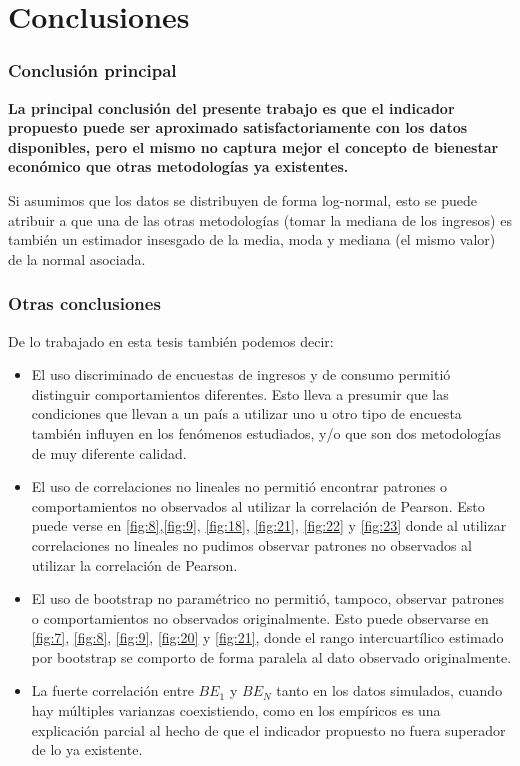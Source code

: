 \chapter{Conclusiones} \label{chapter:conclusiones}

\subsection{Conclusión principal}

\textbf{La principal conclusión del presente trabajo es que el indicador propuesto puede ser aproximado satisfactoriamente con los datos disponibles, pero el mismo no captura mejor el concepto de bienestar económico que otras metodologías ya existentes.}

Si asumimos que los datos se distribuyen de forma log-normal, esto se puede atribuir a que una de las otras metodologías (tomar la mediana de los ingresos) es también un estimador insesgado de la media, moda y mediana (el mismo valor) de la normal asociada.

\subsection{Otras conclusiones}

De lo trabajado en esta tesis también podemos decir:

\begin{itemize}
    \item El uso discriminado de encuestas de ingresos y de consumo permitió distinguir comportamientos diferentes. Esto lleva a presumir que las condiciones que llevan a un país a utilizar uno u otro tipo de encuesta también influyen en los fenómenos estudiados, y/o que son dos metodologías de muy diferente calidad.
    
    \item El uso de correlaciones no lineales no permitió encontrar patrones o comportamientos no observados al utilizar la correlación de Pearson. Esto puede verse en  \ref{fig:8},\ref{fig:9}, \ref{fig:18}, \ref{fig:21}, \ref{fig:22} y \ref{fig:23} donde al utilizar correlaciones no lineales no pudimos observar patrones no observados al utilizar la correlación de Pearson.
    
    \item El uso de bootstrap no paramétrico no permitió, tampoco, observar patrones o comportamientos no observados originalmente. Esto puede observarse en \ref{fig:7}, \ref{fig:8}, \ref{fig:9}, \ref{fig:20} y \ref{fig:21}, donde el rango intercuartílico estimado por bootstrap se comporto de forma paralela al dato observado originalmente.

    \item La fuerte correlación entre $BE_1$ y $BE_N$ tanto en los datos simulados, cuando hay múltiples varianzas coexistiendo, como en los empíricos es una explicación parcial al hecho de que el indicador propuesto no fuera superador de lo ya existente.
\end{itemize}

